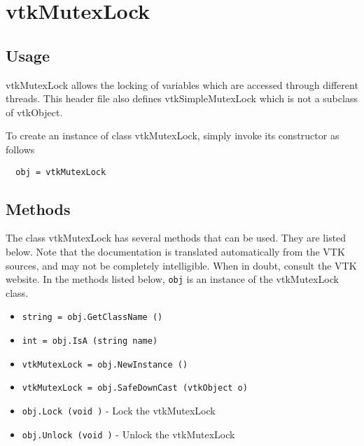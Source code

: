 \section{vtkMutexLock}

\subsection{Usage}

 vtkMutexLock allows the locking of variables which are accessed 
 through different threads.  This header file also defines 
 vtkSimpleMutexLock which is not a subclass of vtkObject.

To create an instance of class vtkMutexLock, simply
invoke its constructor as follows
\begin{verbatim}
  obj = vtkMutexLock
\end{verbatim}
\subsection{Methods}

The class vtkMutexLock has several methods that can be used.
  They are listed below.
Note that the documentation is translated automatically from the VTK sources,
and may not be completely intelligible.  When in doubt, consult the VTK website.
In the methods listed below, \verb|obj| is an instance of the vtkMutexLock class.
\begin{itemize}
\item  \verb|string = obj.GetClassName ()|

\item  \verb|int = obj.IsA (string name)|

\item  \verb|vtkMutexLock = obj.NewInstance ()|

\item  \verb|vtkMutexLock = obj.SafeDownCast (vtkObject o)|

\item  \verb|obj.Lock (void )| -  Lock the vtkMutexLock

\item  \verb|obj.Unlock (void )| -  Unlock the vtkMutexLock

\end{itemize}

